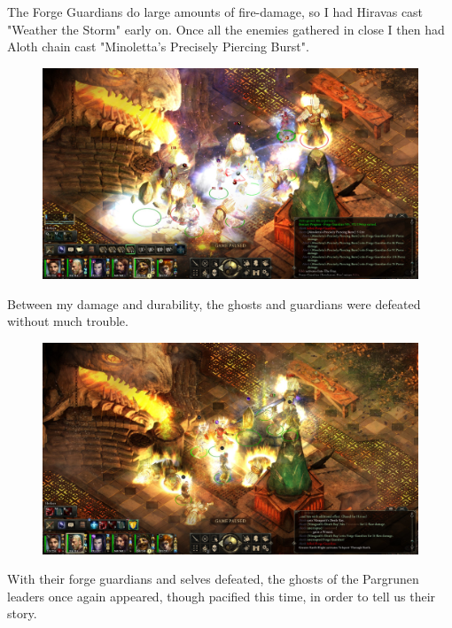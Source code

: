 \documentclass{article}
\begin{document}
The Forge Guardians do large amounts of fire-damage, so I had Hiravas cast "Weather the Storm" early on.  Once all the enemies gathered in close I then had Aloth chain cast "Minoletta's Precisely Piercing Burst".

\begin{figure}
\includegraphics[scale=0.33]{files/blog/2019_08_17_poe_potd_wmpt1/2019_08_17_durgans_battery_08.jpg}
\end{figure}

Between my damage and durability, the ghosts and guardians were defeated without much trouble.

\begin{figure}
\includegraphics[scale=0.33]{files/blog/2019_08_17_poe_potd_wmpt1/2019_08_17_durgans_battery_09.jpg}
\end{figure}

With their forge guardians and selves defeated, the ghosts of the Pargrunen leaders once again appeared, though pacified this time, in order to tell us their story.
\end{document}
